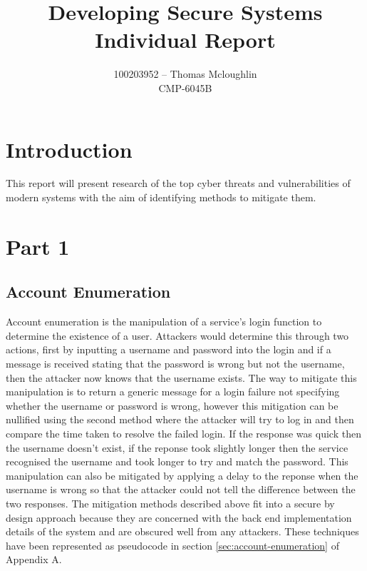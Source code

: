 \documentclass{ueacmpstyle}
\begin{document}
	\title{Developing Secure Systems Individual Report}
	\author{
		100203952 -- Thomas Mcloughlin\\
		CMP-6045B
	}
	\maketitle

    \section{Introduction}\label{sec:Intro}
    This report will present research of the top cyber threats and vulnerabilities of modern 
    systems with the aim of identifying methods to mitigate them.

    \section{Part 1}\label{sec:Pt1}
        
        \subsection{Account Enumeration}\label{sub:AccEnum}
        Account enumeration is the manipulation of a service's login function to determine 
        the existence of a user. Attackers would determine this through two actions, first 
        by inputting a username and password into the login and if a message is received 
        stating that the password is wrong but not the username, then the attacker now 
        knows that the username exists. The way to mitigate this manipulation is to return 
        a generic message for a login failure not specifying whether the username or 
        password is wrong, however this mitigation can be nullified using the second method 
        where the attacker will try to log in and then compare the time taken to resolve the 
        failed login. If the response was quick then the username doesn't exist, if the 
        reponse took slightly longer then the service recognised the username and took longer 
        to try and match the password. This manipulation can also be mitigated by applying a 
        delay to the reponse when the username is wrong so that the attacker could not 
        tell the difference between the two responses.
        The mitigation methods described above fit into a secure by design approach because 
        they are concerned with the back end implementation details of the system and are 
        obscured well from any attackers. These techniques have been represented as 
        pseudocode in section \ref{sec:account-enumeration} of Appendix A.
\end{document}
